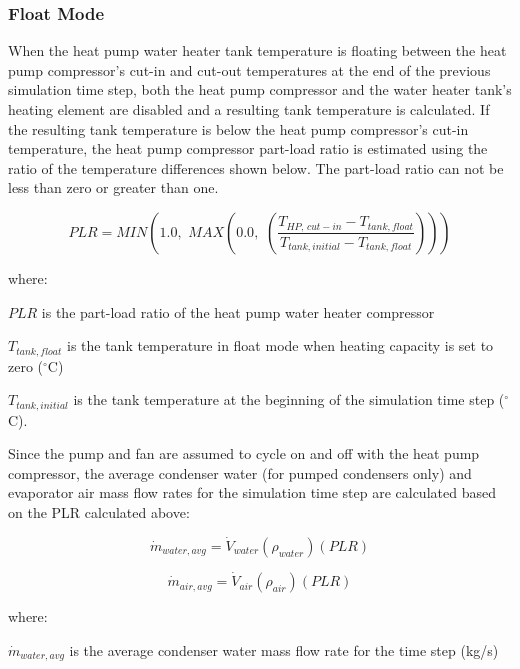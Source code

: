 \subsubsection{Float Mode}\label{float-mode-000}

When the heat pump water heater tank temperature is floating between the heat pump compressor's cut-in and cut-out temperatures at the end of the previous simulation time step, both the heat pump compressor and the water heater tank's heating element are disabled and a resulting tank temperature is calculated. If the resulting tank temperature is below the heat pump compressor's cut-in temperature, the heat pump compressor part-load ratio is estimated using the ratio of the temperature differences shown below. The part-load ratio can not be less than zero or greater than one.

\begin{equation}
PLR = MIN\left( {1.0,\,\,MAX\left( {0.0,\,\,\left( {\frac{{{T_{HP,\,cut - in}} - {T_{tank,float}}}}{{{T_{tank,initial}} - {T_{tank,float}}}}} \right)} \right)} \right)
\end{equation}

where:

\(PLR\) is the part-load ratio of the heat pump water heater compressor

\({T_{tank,float}}\) is the tank temperature in float mode when heating capacity is set to zero (\(^{\circ}\)C)

\({T_{tank,initial}}\) is the tank temperature at the beginning of the simulation time step (\(^{\circ}\)C).

Since the pump and fan are assumed to cycle on and off with the heat pump compressor, the average condenser water (for pumped condensers only) and evaporator air mass flow rates for the simulation time step are calculated based on the PLR calculated above:

\begin{equation}
{\dot m_{water,avg}} = {\dot V_{water}}\left( {{\rho_{water}}} \right)\left( {PLR} \right)
\end{equation}

\begin{equation}
\dot m_{air,avg} = {\dot V_{air}}\left( {{\rho_{air}}} \right)\left( {PLR} \right)
\end{equation}

where:

\({\dot m_{water,avg}}\) is the average condenser water mass flow rate for the time step (kg/s)

